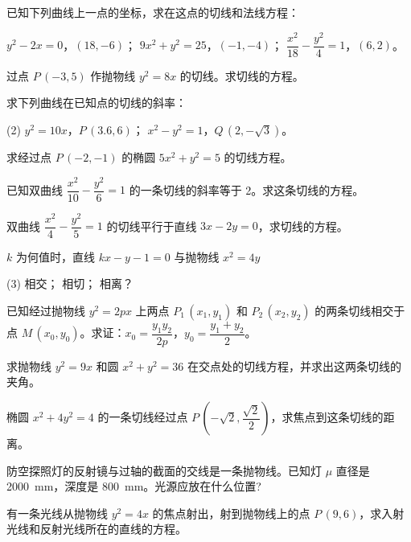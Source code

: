 \begin{Practice}
  \begin{question}
    \item 已知下列曲线上一点的坐标，求在这点的切线和法线方程：
    \begin{tasks}
      \task $y^2-2x=0$，$(18,-6)$；
      \task $9x^2+y^2=25$，$(-1,-4)$；
      \task $\dfrac{x^2}{18}-\dfrac{y^2}{4}=1$，$(6,2)$。
    \end{tasks}
    \item 过点 $P\,(-3,5)$ 作抛物线 $y^2=8x$ 的切线。求切线的方程。
  \end{question}
\end{Practice}
\begin{Exercise}
  \begin{question}
    \item 求下列曲线在已知点的切线的斜率：
    \begin{tasks}(2)
      \task $y^2=10x$，$P\,(3.6,6)$；
      \task $x^2-y^2=1$，$Q\,(2,-\sqrt{3})$。
    \end{tasks}
    \item 求经过点 $P\,(-2,-1)$ 的椭圆 $5x^2+y^2=5$ 的切线方程。
    \item 已知双曲线 $\dfrac{x^2}{10}-\dfrac{y^2}{6}=1$ 的一条切线的斜率等于 2。求这条切线的方程。
    \item 双曲线 $\dfrac{x^2}{4}-\dfrac{y^2}{5}=1$ 的切线平行于直线 $3x-2y=0$，求切线的方程。
    \item $k$ 为何值时，直线 $kx-y-1=0$ 与抛物线 $x^2=4y$
    \begin{tasks}(3)
      \task 相交；
      \task 相切；
      \task 相离？
    \end{tasks}
    \item 已知经过抛物线 $y^2=2px$ 上两点 $P_1\,(x_1,y_1)$ 和 $P_2\,(x_2,y_2)$ 的两条切线相交于点 $M\,(x_0,y_0)$。求证：$x_0=\dfrac{y_1y_2}{2p}$，$y_0=\dfrac{y_1+y_2}{2}$。
    \item 求抛物线 $y^2=9x$ 和圆 $x^2+y^2=36$ 在交点处的切线方程，并求出这两条切线的夹角。
    \item 椭圆 $x^2+4y^2=4$ 的一条切线经过点 $P\,(-\sqrt{2},\dfrac{\sqrt{2}}{2})$，求焦点到这条切线的距离。
    \item 防空探照灯的反射镜与过轴的截面的交线是一条抛物线。已知灯 $\mu$ 直径是 \qty{2000}{mm}，深度是 \qty{800}{mm}。光源应放在什么位置?
    \item 有一条光线从抛物线 $y^2=4x$ 的焦点射出，射到抛物线上的点 $P\,(9,6)$，求入射光线和反射光线所在的直线的方程。
  \end{question}
\end{Exercise}
